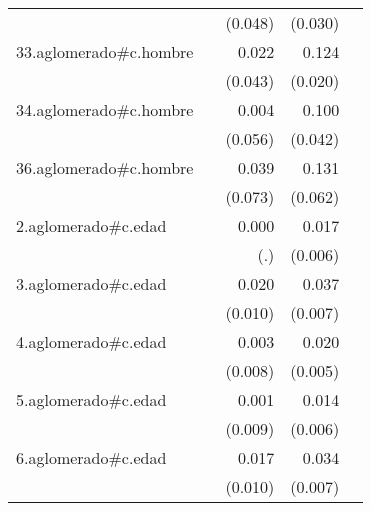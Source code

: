 {\begin{longtable}{l*{4}{D{.}{.}{-1}}}
            &                     &     (0.048)         &     (0.030)         &                     \\
\addlinespace
33.aglomerado#c.hombre&                     &       0.022         &       0.124\sym{***}&                     \\
            &                     &     (0.043)         &     (0.020)         &                     \\
\addlinespace
34.aglomerado#c.hombre&                     &       0.004         &       0.100\sym{*}  &                     \\
            &                     &     (0.056)         &     (0.042)         &                     \\
\addlinespace
36.aglomerado#c.hombre&                     &       0.039         &       0.131\sym{*}  &                     \\
            &                     &     (0.073)         &     (0.062)         &                     \\
\addlinespace
2.aglomerado#c.edad&                     &       0.000         &       0.017\sym{**} &                     \\
            &                     &         (.)         &     (0.006)         &                     \\
\addlinespace
3.aglomerado#c.edad&                     &       0.020\sym{*}  &       0.037\sym{***}&                     \\
            &                     &     (0.010)         &     (0.007)         &                     \\
\addlinespace
4.aglomerado#c.edad&                     &       0.003         &       0.020\sym{***}&                     \\
            &                     &     (0.008)         &     (0.005)         &                     \\
\addlinespace
5.aglomerado#c.edad&                     &       0.001         &       0.014\sym{*}  &                     \\
            &                     &     (0.009)         &     (0.006)         &                     \\
\addlinespace
6.aglomerado#c.edad&                     &       0.017         &       0.034\sym{***}&                     \\
            &                     &     (0.010)         &     (0.007)         &                     \\

\end{longtable}}
